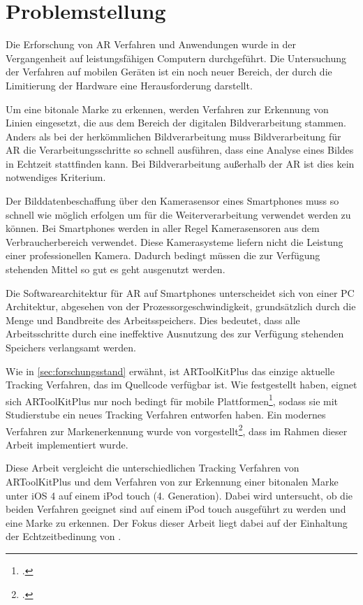 \section{Problemstellung} %
\label{sec:problemstellung}
\begin{comment}
	Problemstellung: Problemstellung und Frage im Detail erläutern
\end{comment}

Die Erforschung von \gls{AR} Verfahren und Anwendungen wurde in der Vergangenheit auf leistungsfähigen Computern
 durchgeführt. Die Untersuchung der Verfahren auf mobilen Geräten ist ein noch neuer Bereich, der durch die Limitierung
 der Hardware eine Herausforderung darstellt.

Um eine bitonale Marke zu erkennen, werden Verfahren zur Erkennung von Linien eingesetzt, die aus dem Bereich der
 digitalen Bildverarbeitung stammen. Anders als bei der herkömmlichen Bildverarbeitung muss Bildverarbeitung für
 \gls{AR} die Verarbeitungsschritte so schnell ausführen, dass eine Analyse eines Bildes in Echtzeit stattfinden kann.
 Bei Bildverarbeitung außerhalb der \gls{AR} ist dies kein notwendiges Kriterium.

Der Bilddatenbeschaffung über den Kamerasensor eines Smartphones muss so schnell wie möglich erfolgen um für die
 Weiterverarbeitung verwendet werden zu können. Bei Smartphones werden in aller Regel Kamerasensoren aus dem
 Verbraucherbereich verwendet. Diese Kamerasysteme liefern nicht die Leistung einer professionellen Kamera. Dadurch
 bedingt müssen die zur Verfügung stehenden Mittel so gut es geht ausgenutzt werden.

Die Softwarearchitektur für \gls{AR} auf Smartphones unterscheidet sich von einer PC Architektur, abgesehen von der
 Prozessorgeschwindigkeit, grundsätzlich durch die Menge und Bandbreite des Arbeitsspeichers. Dies bedeutet, dass alle
 Arbeitsschritte durch eine ineffektive Ausnutzung des zur Verfügung stehenden Speichers verlangsamt werden.

Wie in \autoref{sec:forschungsstand} erwähnt, ist ARToolKitPlus das einzige aktuelle Tracking Verfahren, das im
 Quellcode verfügbar ist. Wie \citeauthor{wagner09a} festgestellt haben, eignet sich ARToolKitPlus nur noch bedingt für
 mobile Plattformen\footcite{wagner09a}, sodass sie mit Studierstube ein neues Tracking Verfahren entworfen haben. Ein
 modernes Verfahren zur Markenerkennung wurde von \citeauthor{hirzer08} vorgestellt\footcite{hirzer08}, dass im Rahmen
 dieser Arbeit implementiert wurde.

Diese Arbeit vergleicht die unterschiedlichen Tracking Verfahren von ARToolKitPlus und dem Verfahren von
 \citeauthor{hirzer08} zur Erkennung einer bitonalen Marke unter iOS 4 auf einem iPod touch (4. Generation). Dabei wird
 untersucht, ob die beiden Verfahren geeignet sind auf einem iPod touch ausgeführt zu werden und eine Marke zu
 erkennen. Der Fokus dieser Arbeit liegt dabei auf der Einhaltung der Echtzeitbedinung von \citeauthor{azuma97}.

